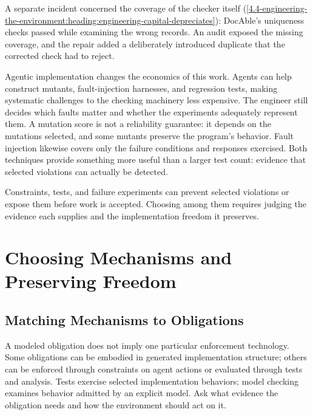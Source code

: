 A separate incident concerned the coverage of the checker itself (\autoref{4.4-engineering-the-environment:heading:engineering-capital-depreciates}): DocAble's uniqueness checks passed while examining the wrong records. An audit exposed the missing coverage, and the repair added a deliberately introduced duplicate that the corrected check had to reject.

Agentic implementation changes the economics of this work. Agents can help construct mutants, fault-injection harnesses, and regression tests, making systematic challenges to the checking machinery less expensive. The engineer still decides which faults matter and whether the experiments adequately represent them. A mutation score is not a reliability guarantee: it depends on the mutations selected, and some mutants preserve the program's behavior. Fault injection likewise covers only the failure conditions and responses exercised. Both techniques provide something more useful than a larger test count: evidence that selected violations can actually be detected.

Constraints, tests, and failure experiments can prevent selected violations or expose them before work is accepted. Choosing among them requires judging the evidence each supplies and the implementation freedom it preserves.

\section{Choosing Mechanisms and Preserving Freedom}\label{heading:choosing-and-calibrating-governance-mechanisms}

\subsection{Matching Mechanisms to Obligations}\label{heading:one-obligation-several-ways-to-hold-it}



A modeled obligation does not imply one particular enforcement technology. Some obligations can be embodied in generated implementation structure; others can be enforced through constraints on agent actions or evaluated through tests and analysis. Tests exercise selected implementation behaviors; model checking examines behavior admitted by an explicit model. Ask what evidence the obligation needs and how the environment should act on it.

